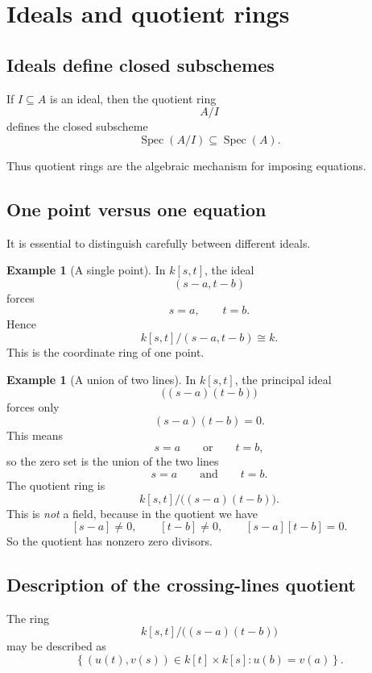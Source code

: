 \documentclass[12pt,a4paper]{article}
\theoremstyle{notespace}
\newcommand{\Spec}{\operatorname{Spec}}
\theoremstyle{definition}
\newtheorem{example}[definition]{Example}
\begin{document}
	\section{Ideals and quotient rings}
	
	\subsection{Ideals define closed subschemes}
	
	If \(I\subseteq A\) is an ideal, then the quotient ring
	\[
	A/I
	\]
	defines the closed subscheme
	\[
	\Spec(A/I)\subseteq \Spec(A).
	\]
	
	Thus quotient rings are the algebraic mechanism for imposing equations.
	
	\subsection{One point versus one equation}
	
	It is essential to distinguish carefully between different ideals.
	
	\begin{example}[A single point]
		In \(k[s,t]\), the ideal
		\[
		(s-a,t-b)
		\]
		forces
		\[
		s=a,\qquad t=b.
		\]
		Hence
		\[
		k[s,t]/(s-a,t-b)\cong k.
		\]
		This is the coordinate ring of one point.
	\end{example}
	
	\begin{example}[A union of two lines]
		In \(k[s,t]\), the principal ideal
		\[
		\bigl((s-a)(t-b)\bigr)
		\]
		forces only
		\[
		(s-a)(t-b)=0.
		\]
		This means
		\[
		s=a
		\qquad\text{or}\qquad
		t=b,
		\]
		so the zero set is the union of the two lines
		\[
		s=a
		\qquad\text{and}\qquad
		t=b.
		\]
		The quotient ring is
		\[
		k[s,t]/\bigl((s-a)(t-b)\bigr).
		\]
		This is \emph{not} a field, because in the quotient we have
		\[
		[s-a]\neq 0,\qquad [t-b]\neq 0,\qquad [s-a][t-b]=0.
		\]
		So the quotient has nonzero zero divisors.
	\end{example}
	
	\subsection{Description of the crossing-lines quotient}
	
	The ring
	\[
	k[s,t]/\bigl((s-a)(t-b)\bigr)
	\]
	may be described as
	\[
	\left\{(u(t),v(s))\in k[t]\times k[s] : u(b)=v(a)\right\}.
	\]
	
\end{document}

